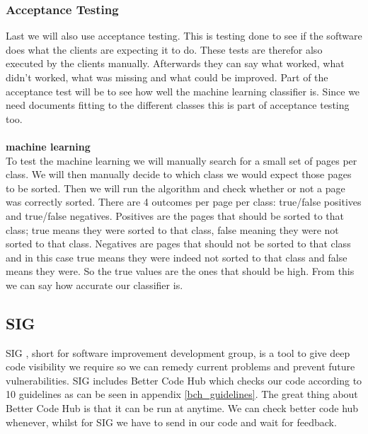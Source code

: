 \subsubsection{Acceptance Testing}
Last we will also use acceptance testing. This is testing done to see if the software does what the clients are expecting it to do. These tests are therefor also executed by the clients manually. Afterwards they can say what worked, what didn't worked, what was missing and what could be improved. Part of the acceptance test will be to see how well the machine learning classifier is. Since we need documents fitting to the different classes this is part of acceptance testing too.\\
\\
\textbf{machine learning} \\
To test the machine learning we will manually search for a small set of pages per class. We will then manually decide to which class we would expect those pages to be sorted. Then we will run the algorithm and check whether or not a page was correctly sorted. There are 4 outcomes per page per class: true/false positives and true/false negatives. Positives are the pages that should be sorted to that class; true means they were sorted to that class, false meaning they were not sorted to that class. Negatives are pages that should not be sorted to that class and in this case true means they were indeed not sorted to that class and false means they were. So the true values are the ones that should be high. From this we can say how accurate our classifier is.

\subsection{SIG}
SIG \cite{sig}, short for software improvement development group, is a tool to give deep code visibility we require so we can remedy current problems and prevent future vulnerabilities. SIG includes Better Code Hub \cite{better_code_hub} which checks our code according to 10 guidelines as can be seen in appendix \ref{bch_guidelines}. The great thing about Better Code Hub is that it can be run at anytime. We can check better code hub whenever, whilst for SIG we have to send in our code and wait for feedback.


\begin{comment}
- double city names
- city names with meaning (leiden)
- city/province names (utrecht / groningen / zeeland)
\end{comment}